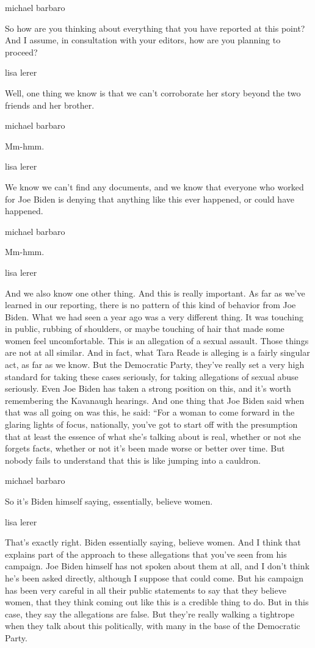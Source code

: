 michael barbaro

So how are you thinking about everything that you have reported at this
point? And I assume, in consultation with your editors, how are you
planning to proceed?

lisa lerer

Well, one thing we know is that we can't corroborate her story beyond
the two friends and her brother.

michael barbaro

Mm-hmm.

lisa lerer

We know we can't find any documents, and we know that everyone who
worked for Joe Biden is denying that anything like this ever happened,
or could have happened.

michael barbaro

Mm-hmm.

lisa lerer

And we also know one other thing. And this is really important. As far
as we've learned in our reporting, there is no pattern of this kind of
behavior from Joe Biden. What we had seen a year ago was a very
different thing. It was touching in public, rubbing of shoulders, or
maybe touching of hair that made some women feel uncomfortable. This is
an allegation of a sexual assault. Those things are not at all similar.
And in fact, what Tara Reade is alleging is a fairly singular act, as
far as we know. But the Democratic Party, they've really set a very high
standard for taking these cases seriously, for taking allegations of
sexual abuse seriously. Even Joe Biden has taken a strong position on
this, and it's worth remembering the Kavanaugh hearings. And one thing
that Joe Biden said when that was all going on was this, he said: ``For
a woman to come forward in the glaring lights of focus, nationally,
you've got to start off with the presumption that at least the essence
of what she's talking about is real, whether or not she forgets facts,
whether or not it's been made worse or better over time. But nobody
fails to understand that this is like jumping into a cauldron.

michael barbaro

So it's Biden himself saying, essentially, believe women.

lisa lerer

That's exactly right. Biden essentially saying, believe women. And I
think that explains part of the approach to these allegations that
you've seen from his campaign. Joe Biden himself has not spoken about
them at all, and I don't think he's been asked directly, although I
suppose that could come. But his campaign has been very careful in all
their public statements to say that they believe women, that they think
coming out like this is a credible thing to do. But in this case, they
say the allegations are false. But they're really walking a tightrope
when they talk about this politically, with many in the base of the
Democratic Party.

